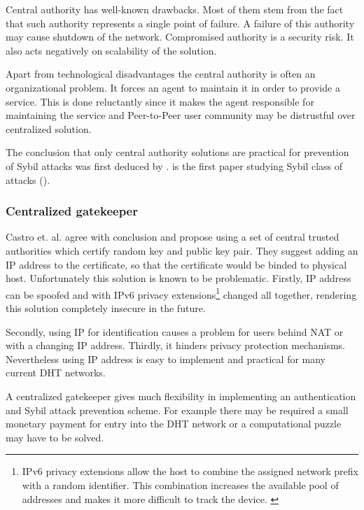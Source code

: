   Central authority has well-known drawbacks. Most of them stem from the fact
  that such authority represents a single point of failure.
  A failure of this authority may cause shutdown of the network.
  Compromised authority is a security risk.
  It also acts negatively on scalability of the solution.
  
  Apart from technological disadvantages the central authority is often an
  organizational problem.
  It forces an agent to maintain it in order to provide a service.
  This is done reluctantly since it makes the agent responsible for maintaining
  the service and Peer-to-Peer user community may be distrustful over
  centralized solution.

  The conclusion that only central authority solutions are practical for
  prevention of Sybil attacks was first deduced by \cite{dou02}.
  \cite{dou02} is the first paper studying Sybil class of attacks
  (\cite{urd11}).

  \subsubsection{Centralized gatekeeper}
  \label{subsubsec:centralized_gatekeeper}
  Castro et. al. \cite{cas02} agree with \cite{dou02} conclusion and propose
  using a set of central trusted authorities which certify random key and public
  key pair. They suggest adding an IP address to the certificate, so that the
  certificate would be binded to physical host. Unfortunately this solution is
  known to be problematic. Firstly, IP address can be spoofed and with IPv6
  privacy extensions\footnote{IPv6 privacy extensions allow the host to combine
    the assigned network prefix with a random identifier.
    This combination increases the available pool of addresses and makes it more
    difficult to track the device.  \cite{nar01}}
  changed all together, rendering this solution completely
  insecure in the future.
  
  Secondly, using IP for identification causes a problem for users behind NAT or
  with a changing IP address.
  Thirdly, it hinders privacy protection mechanisms.
  Nevertheless using IP address is easy to implement and practical for many
  current DHT networks.

  A centralized gatekeeper gives much flexibility in implementing an
  authentication and Sybil attack prevention scheme. For example there may be
  required a small monetary payment for entry into the DHT network or a
  computational puzzle may have to be solved.

